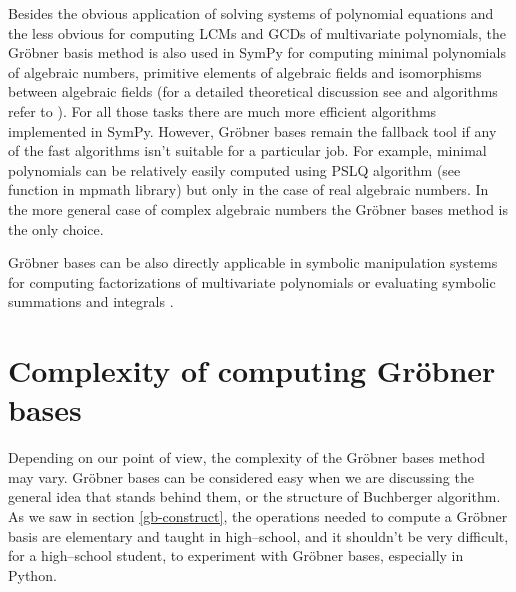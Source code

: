 Besides the obvious application of solving systems of polynomial equations and the less obvious
for computing LCMs and GCDs of multivariate polynomials, the Gröbner basis method is also used
in SymPy for computing minimal polynomials of algebraic numbers, primitive elements of algebraic
fields and isomorphisms between algebraic fields (for a detailed theoretical discussion see
\cite{Adams1994intro} and algorithms refer to \cite{Cohen1993course}). For all those tasks there
are much more efficient algorithms implemented in SymPy. However, Gröbner bases remain the
fallback tool if any of the fast algorithms isn't suitable for a particular job. For example,
minimal polynomials can be relatively easily computed using PSLQ algorithm (see 
function in mpmath library) but only in the case of real algebraic numbers. In the more general
case of complex algebraic numbers the Gröbner bases method is the only choice.

Gröbner bases can be also directly applicable in symbolic manipulation systems for computing
factorizations of multivariate polynomials \cite{Gianni1985groebner} or evaluating symbolic summations
and integrals \cite{Chyzak1998groebner}.


\section{Complexity of computing Gröbner bases}

Depending on our point of view, the complexity of the Gröbner bases method may vary. Gröbner
bases can be considered easy when we are discussing the general idea that stands behind them, or
the structure of Buchberger algorithm. As we saw in section \ref{gb-construct}, the operations
needed to compute a Gröbner basis are elementary and taught in high--school, and it shouldn't be
very difficult, for a high--school student, to experiment with Gröbner bases, especially in Python.

